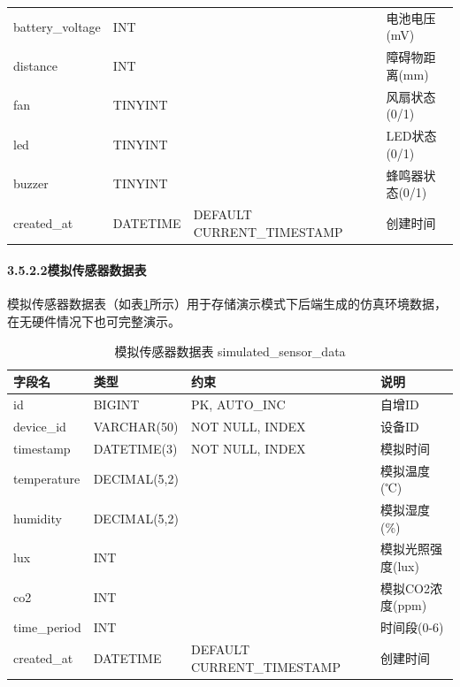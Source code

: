 \documentclass{article}
\begin{document}
\begin{table}[htbp]
\begin{tabular}{|l|l|l|l|}
    battery\_voltage & INT          &                             & 电池电压(mV)      \\
    distance        & INT          &                             & 障碍物距离(mm)    \\
    fan             & TINYINT      &                             & 风扇状态(0/1)     \\
    led             & TINYINT      &                             & LED状态(0/1)      \\
    buzzer          & TINYINT      &                             & 蜂鸣器状态(0/1)   \\
    created\_at      & DATETIME     & DEFAULT CURRENT\_TIMESTAMP  & 创建时间          \\
    \hline
  \end{tabular}
\end{table}

\paragraph{3.5.2.2模拟传感器数据表}

模拟传感器数据表（如表\ref{tab:模拟传感器数据表}所示）用于存储演示模式下后端生成的仿真环境数据，在无硬件情况下也可完整演示。

\begin{table}[htbp]
  \centering
  \caption{模拟传感器数据表 simulated\_sensor\_data}
  \label{tab:模拟传感器数据表}
  \begin{tabular}{|l|l|l|l|}
    \hline
    字段名      & 类型         & 约束                        & 说明              \\
    \hline
    id          & BIGINT       & PK, AUTO\_INC               & 自增ID            \\
    device\_id   & VARCHAR(50)  & NOT NULL, INDEX             & 设备ID            \\
    timestamp   & DATETIME(3)  & NOT NULL, INDEX             & 模拟时间          \\
    temperature & DECIMAL(5,2) &                             & 模拟温度(℃)       \\
    humidity    & DECIMAL(5,2) &                             & 模拟湿度(\%)       \\
    lux         & INT          &                             & 模拟光照强度(lux) \\
    co2         & INT          &                             & 模拟CO2浓度(ppm)  \\
    time\_period & INT         &                             & 时间段(0-6)       \\
    created\_at  & DATETIME    & DEFAULT CURRENT\_TIMESTAMP  & 创建时间          \\
    \hline
  \end{tabular}
\end{table}
\end{document}
